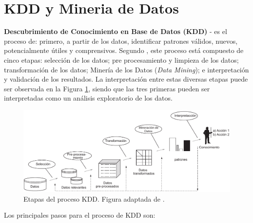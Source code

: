 \section{KDD y Mineria de Datos}\label{sec:kdd-datamining}

\textbf{Descubrimiento de Conocimiento en Base de Datos (KDD)} - es el proceso de: primero, a partir de los datos, identificar patrones válidos, nuevos, potencialmente útiles y comprensivos. Segundo \cite{Fayyad:1996:DMK:257938.257942}, este proceso está compuesto de cinco etapas: selección de los datos; pre procesamiento y limpieza de los datos; transformación de los datos; Minería de los Datos (\textit{Data Mining}); e interpretación y validación de los resultados. La interpretación entre estas diversas etapas puede ser observada en la Figura \ref{fig:processoKDD}, siendo que las tres primeras pueden ser interpretadas como un análisis exploratorio de los datos.

\begin{figure}[htp]
\centering
\includegraphics[width=0.99\columnwidth]{chapter3/KDD-process.pdf}
\caption{Etapas del proceso KDD. Figura adaptada de \cite{Fayyad:1996:DMK:257938.257942}.}
\label{fig:processoKDD}
\end{figure}


Los principales pasos para el proceso de KDD son:

